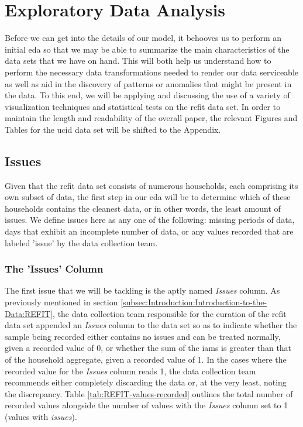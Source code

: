 \chapter{Exploratory Data Analysis}
\label{ch:Exploratory-Data-Analysis}
Before we can get into the details of our model, it behooves us to perform an initial \gls{eda} so that we may be able to summarize the main characteristics of the data sets that we have on hand. This will both help us understand how to perform the necessary data transformations needed to render our data serviceable as well as aid in the discovery of patterns or anomalies that might be present in the data. To this end, we will be applying and discussing the use of a variety of visualization techniques and statistical tests on the \gls{refit} data set. In order to maintain the length and readability of the overall paper, the relevant Figures and Tables for the \gls{ucid} data set will be shifted to the Appendix.

\section{Issues}
\label{sec:Exploratory-Data-Analysis:Issues}
Given that the \gls{refit} data set consists of numerous households, each comprising its own subset of data, the first step in our \gls{eda} will be to determine which of these households contains the cleanest data, or in other words, the least amount of issues. We define issues here as any one of the following: missing periods of data, days that exhibit an incomplete number of data, or any values recorded that are labeled 'issue' by the data collection team.

\subsection{The 'Issues' Column}
\label{subsec:Exploratory-Data-Analysis:Issues:The-Issues-Column}
The first issue that we will be tackling is the aptly named \textit{Issues} column. As previously mentioned in section \ref{subsec:Introduction:Introduction-to-the-Data:REFIT}, the data collection team responsible for the curation of the \gls{refit} data set appended an \textit{Issues} column to the data set so as to indicate whether the sample being recorded either contains no issues and can be treated normally, given a recorded value of 0, or whether the sum of the \glspl{iam} is greater than that of the household aggregate, given a recorded value of 1. In the cases where the recorded value for the \textit{Issues} column reads 1, the data collection team recommends either completely discarding the data or, at the very least, noting the discrepancy. Table \ref{tab:REFIT-values-recorded} outlines the total number of recorded values alongside the number of values with the \textit{Issues} column set to 1 (\ie values with \textit{issues}).

